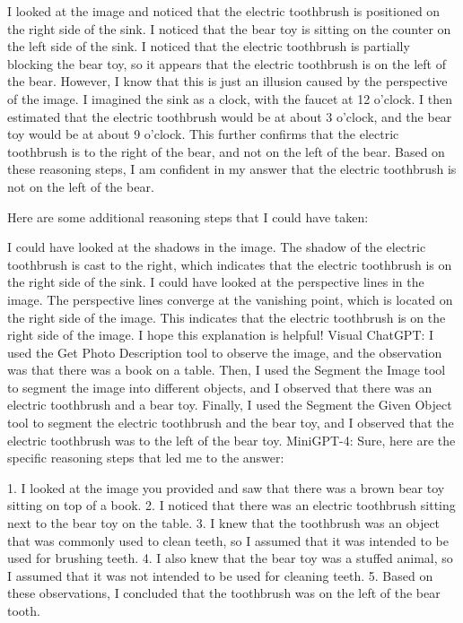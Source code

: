 \begin{enumerate}
        I looked at the image and noticed that the electric toothbrush is positioned on the right side of the sink.
        I noticed that the bear toy is sitting on the counter on the left side of the sink.
        I noticed that the electric toothbrush is partially blocking the bear toy, so it appears that the electric toothbrush is on the left of the bear. However, I know that this is just an illusion caused by the perspective of the image.
        I imagined the sink as a clock, with the faucet at 12 o'clock. I then estimated that the electric toothbrush would be at about 3 o'clock, and the bear toy would be at about 9 o'clock. This further confirms that the electric toothbrush is to the right of the bear, and not on the left of the bear.
        Based on these reasoning steps, I am confident in my answer that the electric toothbrush is not on the left of the bear.
        
        Here are some additional reasoning steps that I could have taken:
        
        I could have looked at the shadows in the image. The shadow of the electric toothbrush is cast to the right, which indicates that the electric toothbrush is on the right side of the sink.
        I could have looked at the perspective lines in the image. The perspective lines converge at the vanishing point, which is located on the right side of the image. This indicates that the electric toothbrush is on the right side of the image.
        I hope this explanation is helpful!
        \subitem Visual ChatGPT: I used the Get Photo Description tool to observe the image, and the observation was that there was a book on a table. Then, I used the Segment the Image tool to segment the image into different objects, and I observed that there was an electric toothbrush and a bear toy. Finally, I used the Segment the Given Object tool to segment the electric toothbrush and the bear toy, and I observed that the electric toothbrush was to the left of the bear toy.
        \subitem MiniGPT-4: Sure, here are the specific reasoning steps that led me to the answer:

        1. I looked at the image you provided and saw that there was a brown bear toy sitting on top of a book.
        2. I noticed that there was an electric toothbrush sitting next to the bear toy on the table.
        3. I knew that the toothbrush was an object that was commonly used to clean teeth, so I assumed that it was intended to be used for brushing teeth.
        4. I also knew that the bear toy was a stuffed animal, so I assumed that it was not intended to be used for cleaning teeth.
        5. Based on these observations, I concluded that the toothbrush was on the left of the bear tooth.
    \end{enumerate}
